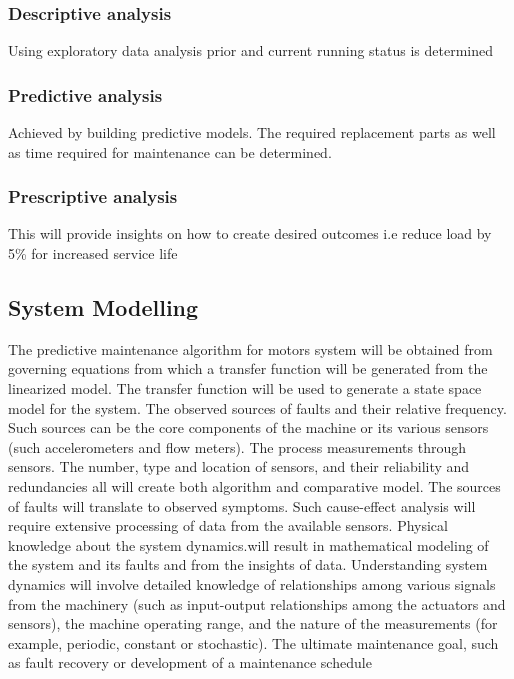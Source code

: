 	\subsubsection{Descriptive analysis}
	Using exploratory data analysis prior and current running status is determined 
	
	\subsubsection{Predictive analysis}
	Achieved by building predictive models. The required replacement parts as well as time required for maintenance can be determined.
	
	\subsubsection{Prescriptive analysis}
	This will provide insights on how to create desired outcomes i.e reduce load by 5\% for increased service life 
	
\subsection{System Modelling}

The predictive maintenance algorithm for motors system will be obtained from governing
equations from which a transfer function will be generated from the linearized model. The
transfer function will be used to generate a state space model for the system.
The observed sources of faults and their relative frequency. Such sources can be the core
components of the machine or its various sensors (such accelerometers and flow meters).
The process measurements through sensors. The number, type and location of sensors,
and their reliability and redundancies all will create both algorithm and comparative
model.
The sources of faults will translate to observed symptoms. Such cause-effect analysis will
require extensive processing of data from the available sensors.
Physical knowledge about the system dynamics.will result in mathematical modeling of
the system and its faults and from the insights of data. Understanding system dynamics
will involve detailed knowledge of relationships among various signals from the machinery
(such as input-output relationships among the actuators and sensors), the machine operating
range, and the nature of the measurements (for example, periodic, constant or stochastic).
The ultimate maintenance goal, such as fault recovery or development of a maintenance
schedule




